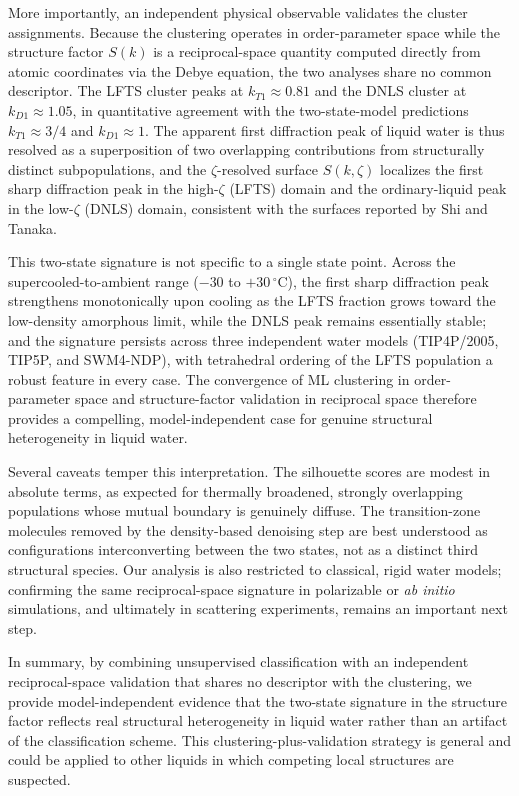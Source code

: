 \documentclass[aps, amsmath,amssymb, reprint, twocolumn, superscriptaddress]{revtex4-2}
\begin{document}
More importantly, an independent physical observable validates the cluster assignments. Because the clustering operates in order-parameter space while the structure factor $S(k)$ is a reciprocal-space quantity computed directly from atomic coordinates via the Debye equation, the two analyses share no common descriptor. The LFTS cluster peaks at $k_{T1} \approx 0.81$ and the DNLS cluster at $k_{D1} \approx 1.05$, in quantitative agreement with the two-state-model predictions $k_{T1} \approx 3/4$ and $k_{D1} \approx 1$. The apparent first diffraction peak of liquid water is thus resolved as a superposition of two overlapping contributions from structurally distinct subpopulations, and the $\zeta$-resolved surface $S(k,\zeta)$ localizes the first sharp diffraction peak in the high-$\zeta$ (LFTS) domain and the ordinary-liquid peak in the low-$\zeta$ (DNLS) domain, consistent with the surfaces reported by Shi and Tanaka.

This two-state signature is not specific to a single state point. Across the supercooled-to-ambient range ($-30$ to $+30\,^\circ$C), the first sharp diffraction peak strengthens monotonically upon cooling as the LFTS fraction grows toward the low-density amorphous limit, while the DNLS peak remains essentially stable; and the signature persists across three independent water models (TIP4P/2005, TIP5P, and SWM4-NDP), with tetrahedral ordering of the LFTS population a robust feature in every case. The convergence of ML clustering in order-parameter space and structure-factor validation in reciprocal space therefore provides a compelling, model-independent case for genuine structural heterogeneity in liquid water.

Several caveats temper this interpretation. The silhouette scores are modest in absolute terms, as expected for thermally broadened, strongly overlapping populations whose mutual boundary is genuinely diffuse. The transition-zone molecules removed by the density-based denoising step are best understood as configurations interconverting between the two states, not as a distinct third structural species. Our analysis is also restricted to classical, rigid water models; confirming the same reciprocal-space signature in polarizable or \emph{ab initio} simulations, and ultimately in scattering experiments, remains an important next step.

In summary, by combining unsupervised classification with an independent reciprocal-space validation that shares no descriptor with the clustering, we provide model-independent evidence that the two-state signature in the structure factor reflects real structural heterogeneity in liquid water rather than an artifact of the classification scheme. This clustering-plus-validation strategy is general and could be applied to other liquids in which competing local structures are suspected.
\end{document}
